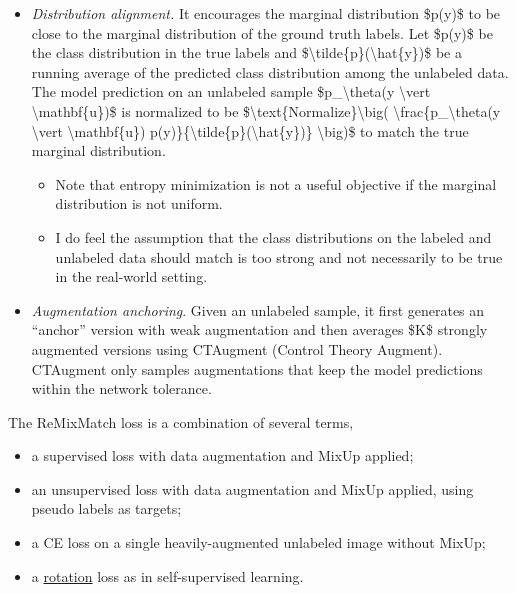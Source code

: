\begin{itemize}
\tightlist
\item
  \emph{Distribution alignment.} It encourages the marginal distribution \$p(y)\$ to be close to the marginal distribution of the ground truth labels. Let \$p(y)\$ be the class distribution in the true labels and \$\textbackslash tilde\{p\}(\textbackslash hat\{y\})\$ be a running average of the predicted class distribution among the unlabeled data. The model prediction on an unlabeled sample \$p\_\textbackslash theta(y \textbackslash vert \textbackslash mathbf\{u\})\$ is normalized to be \$\textbackslash text\{Normalize\}\textbackslash big( \textbackslash frac\{p\_\textbackslash theta(y \textbackslash vert \textbackslash mathbf\{u\}) p(y)\}\{\textbackslash tilde\{p\}(\textbackslash hat\{y\})\} \textbackslash big)\$ to match the true marginal distribution.

  \begin{itemize}
  \tightlist
  \item
    Note that entropy minimization is not a useful objective if the marginal distribution is not uniform.
  \item
    I do feel the assumption that the class distributions on the labeled and unlabeled data should match is too strong and not necessarily to be true in the real-world setting.
  \end{itemize}
\item
  \emph{Augmentation anchoring}. Given an unlabeled sample, it first generates an ``anchor'' version with weak augmentation and then averages \$K\$ strongly augmented versions using CTAugment (Control Theory Augment). CTAugment only samples augmentations that keep the model predictions within the network tolerance.
\end{itemize}

The ReMixMatch loss is a combination of several terms,

\begin{itemize}
\tightlist
\item
  a supervised loss with data augmentation and MixUp applied;
\item
  an unsupervised loss with data augmentation and MixUp applied, using pseudo labels as targets;
\item
  a CE loss on a single heavily-augmented unlabeled image without MixUp;
\item
  a \href{https://lilianweng.github.io/posts/2019-11-10-self-supervised/\#distortion}{rotation} loss as in self-supervised learning.
\end{itemize}

